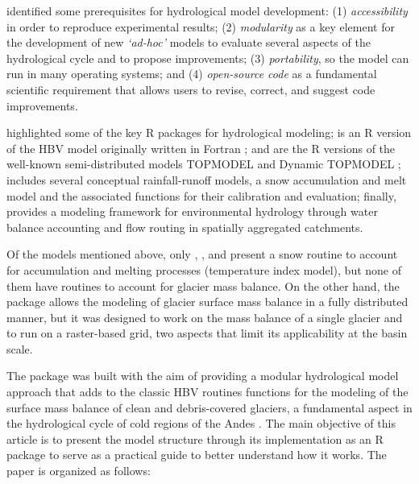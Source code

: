 \citet{buytaert:2008} identified some prerequisites for hydrological model development: (1) \emph{accessibility} in order to
reproduce experimental results; (2) \emph{modularity} as a key element for the development of new \emph{‘ad-hoc’} models
to evaluate several aspects of the hydrological cycle and to propose improvements; (3) \emph{portability}, so the model can run
in many operating systems; and (4) \emph{open-source code} as a fundamental scientific requirement that allows users to revise,
correct, and suggest code improvements.

\citet{slater:2019} highlighted some of the key R packages for hydrological modeling;  is an R version of the HBV
model originally written in Fortran \citep{viglione:2016};  and  are the R versions of
the well-known semi-distributed models TOPMODEL and Dynamic TOPMODEL \citep{topmodel:2018, metcalfe:2015};  
\citep{coron:2017, airGR:2020} includes several conceptual rainfall-runoff models, a snow accumulation and melt model and
the associated functions for their calibration and evaluation; finally,  \citep{andrews:2011} provides a 
modeling framework for environmental hydrology through water balance accounting and flow routing in spatially aggregated
catchments.

Of the models mentioned above, only , , and  present a snow routine to account for
accumulation and melting processes (temperature index model), but none of them have routines to account for glacier mass
balance. On the other hand, the  package \citep{glacier:2017} allows the modeling of glacier surface mass
balance in a fully distributed manner, but it was designed to work on the mass balance of a single glacier and to run on a 
raster-based grid, two aspects that limit its applicability at the basin scale.

The  \citep{toum:2021} package was built with the aim of providing a modular hydrological model 
approach that adds to the classic HBV routines functions for the modeling of the surface mass balance of clean and 
debris-covered glaciers, a fundamental aspect in the hydrological cycle of  cold regions of the Andes \citep{masiokas:2020}. 
The main objective of this article is to present the  model structure through its implementation as an
R package to serve as a practical guide to better understand how it works. The paper is organized as follows:

